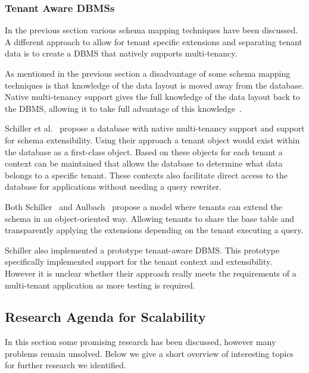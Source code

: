 \subsubsection{Tenant Aware \acp{DBMS}}
\label{sec:tenant_aware}
In the previous section various schema mapping techniques have been discussed.
A different approach to allow for tenant specific extensions and separating tenant data is to create a \ac{DBMS} that natively supports multi-tenancy.

As mentioned in the previous section a disadvantage of some schema mapping techniques is that knowledge of the data layout is moved away from the database.
Native multi-tenancy support gives the full knowledge of the data layout back to the \ac{DBMS}, allowing it to take full advantage of this knowledge~\cite{schiller2011native}.

Schiller et al.~\cite{schiller2011native} propose a database with native multi-tenancy support and support for schema extensibility.
Using their approach a tenant object would exist within the database as a first-class object. 
Based on these objects for each tenant a context can be maintained that allows the database to determine what data belongs to a specific tenant. 
These contexts also facilitate direct access to the database for applications without needing a query rewriter.

Both Schiller~\cite{schiller2011native} and Aulbach~\cite{aulbach2011extensibility} propose a model where tenants can extend the schema in an object-oriented way.
Allowing tenants to share the base table and transparently applying the extensions depending on the tenant executing a query.

Schiller also implemented a prototype tenant-aware \ac{DBMS}.
This prototype specifically implemented support for the tenant context and extensibility.
However it is unclear whether their approach really meets the requirements of a multi-tenant application as more testing is required.


\subsection{Research Agenda for Scalability}\label{sec:scal_agenda}
In this section some promising research has been discussed, however many problems remain unsolved.
Below we give a short overview of interesting topics for further research we identified.


